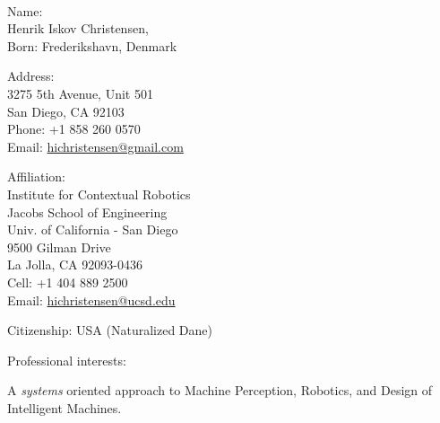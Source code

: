 \documentclass{article}
\begin{document}
\begin{cv}


  \noindent
  \begin{cvlist}{~}
  \item[Name:]\ \\
    Henrik Iskov Christensen,\\
    Born: Frederikshavn, Denmark\\
  \item[Address:]\ \\
    3275 5th Avenue, Unit 501\\
    San Diego, CA 92103\\
    Phone: +1 858 260 0570\\
    Email: \url{hichristensen@gmail.com}\\
  \item[Affiliation:]\ \\
    Institute for Contextual Robotics\\
    Jacobs School of Engineering\\
    Univ. of California - San Diego\\
    9500 Gilman Drive\\   La Jolla, CA 92093-0436\\
    Cell: +1 404 889 2500\\
    Email: \url{hichristensen@ucsd.edu}\\
  \item[Citizenship:] USA (Naturalized Dane)
  \end{cvlist}

  \begin{cvlist}{Professional interests:}
  \item A {\em systems} oriented approach to Machine Perception,
    Robotics, and Design of Intelligent Machines.
  \end{cvlist}




\end{cv}
\end{document}
